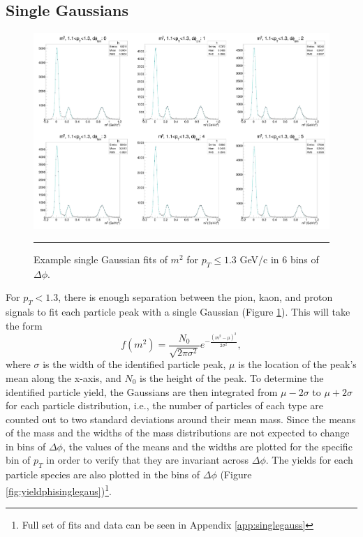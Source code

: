 \subsection{Single Gaussians}
\begin{figure}[htbp!]
  \centering
    \includegraphics[width=1\textwidth]{lowptfits/yieldvsdphi_tof1_cent0_ch1_pT-11-13.jpg}
    \rule{35em}{0.5pt}
  \caption[Example single Gaussian fits of $m^2$ for $p_T\leq1.3$ GeV/c in 6 bins of $\Delta \phi$.]{Example single Gaussian fits of $m^2$ for $p_T\leq1.3$ GeV/c in 6 bins of $\Delta \phi$.}
  \label{fig:singlegausm2}
\end{figure}

For $p_T< 1.3$, there is enough separation between the pion, kaon, and proton signals to fit each particle peak with a single Gaussian (Figure \ref{fig:singlegausm2}). This will take the form
\begin{equation}
f(m^2) = \frac{N_0}{\sqrt{2\pi \sigma^2}} e^{-\frac{(m^2-\mu)^2}{2\sigma^{2}}},
\end{equation}
where $\sigma$ is the width of the identified particle peak, $\mu$ is the location of the peak's mean along the x-axis, and $N_0$ is the height of the peak. To determine the identified particle yield, the Gaussians are then integrated from $\mu-2\sigma$ to $\mu+2\sigma$ for each particle distribution, i.e., the number of particles of each type are counted out to two standard deviations around their mean mass. Since the means of the mass and the widths of the mass distributions are not expected to change in bins of $\Delta \phi$, the values of the means and the widths are plotted for the specific bin of $p_T$ in order to verify that they are invariant across $\Delta \phi$. The yields for each particle species are also plotted in the bins of $\Delta \phi$ (Figure \ref{fig:yieldphisinglegaus})\footnote{Full set of fits and data can be seen in Appendix \ref{app:singlegauss}}.

